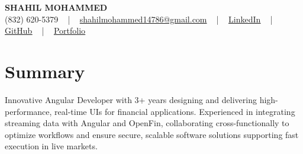 \documentclass[letterpaper,10pt]{article}
\begin{document}
\begin{center}
    {\fontsize{14pt}{12pt}\selectfont \textbf{\MakeUppercase{Shahil Mohammed}}}\\ \vspace{2pt}
    \fontsize{10pt}{12pt}\selectfont (832) 620-5379 ~ | ~ \href{mailto:shahilmohammed14786@gmail.com}{shahilmohammed14786@gmail.com} ~ | ~  
    \href{https://www.linkedin.com/in/shahil-mohammed-9652931a1/}{\color{blue}\underline{LinkedIn}}  ~ | ~ 
    \href{https://github.com/freakbeast14}{\color{blue}\underline{GitHub}} ~ | ~ 
    \href{https://shahil-mohammed.netlify.app/}{\color{blue}\underline{Portfolio}}
    \vspace{-8pt}
\end{center}

\section{Summary}
\vspace{-2pt}\fontsize{8pt}{9pt}\selectfont
Innovative Angular Developer with 3+ years designing and delivering high-performance, real-time UIs for financial applications. Experienced in integrating streaming data with Angular and OpenFin, collaborating cross-functionally to optimize workflows and ensure secure, scalable software solutions supporting fast execution in live markets.
 \vspace{-5pt}
 
\vspace{-2pt}
\end{document}

